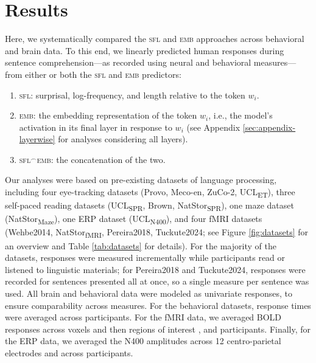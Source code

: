 \documentclass[11pt]{article}
\begin{document}
\section{Results} \label{sec:results}

Here, we systematically compared the \textsc{sfl} and \textsc{emb} approaches across behavioral and brain data. To this end, we linearly predicted human responses during sentence comprehension---as recorded using neural and behavioral measures---from either or both the \textsc{sfl} and \textsc{emb} predictors:

\begin{enumerate}
    \item \textsc{sfl}: surprisal, log-frequency, and length relative to the token $w_i$.
    \item \textsc{emb}: the embedding representation of the token $w_i$, i.e., the model's activation in its final layer in response to $w_i$ (see Appendix \ref{sec:appendix-layerwise} for analyses considering all layers).
    \item \textsc{sfl}$^\frown$\textsc{emb}: the concatenation of the two. 
\end{enumerate}

Our analyses were based on pre-existing datasets of language processing, including four eye-tracking datasets (Provo, Meco-en, ZuCo-2, UCL\textsubscript{ET}), three self-paced reading datasets (UCL\textsubscript{SPR}, Brown, NatStor\textsubscript{SPR}), one maze dataset (NatStor\textsubscript{Maze}), one ERP dataset (UCL\textsubscript{N400}), and four fMRI datasets (Wehbe2014, NatStor\textsubscript{fMRI}, Pereira2018, Tuckute2024; see Figure \ref{fig:datasets} for an overview and Table \ref{tab:datasets} for details). For the majority of the datasets, responses were measured incrementally while participants read or listened to linguistic materials; for Pereira2018 and Tuckute2024, responses were recorded for sentences presented all at once, so a single measure per sentence was used. All brain and behavioral data were modeled as univariate responses, to ensure comparability across measures. For the behavioral datasets, response times were averaged across participants. For the fMRI data, we averaged BOLD responses across voxels and then regions of interest \citep[comprising the language-selective network;][]{fedorenko2024language}, and participants. Finally, for the ERP data, we averaged the N400 amplitudes across 12 centro-parietal electrodes and across participants. 

\smallskip
\end{document}
